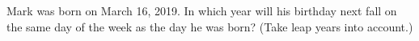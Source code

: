 Mark was born on March 16, 2019. In which year will his birthday next fall on the same day of the week as the day he was born? (Take leap years into account.)
